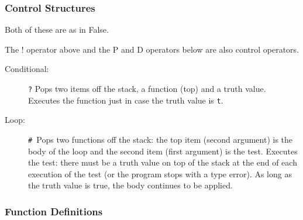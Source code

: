 \documentclass[12pt]{article}
\begin{document}
\subsubsection{Control Structures}

Both of these are as in False.

The ! operator above and the P and D operators below are also
control operators.
\begin{description}
\item[Conditional:]  {\tt ?} Pops two items off the stack, a function (top) and
a truth value.  Executes the function just in case the truth value is {\tt t}.

\item[Loop:]{\tt \# }Pops two functions off the stack:  the top item (second argument)
is the body of the loop and the second item (first argument) is the
test.  Executes the test: there must be a truth value on top of the
stack at the end of each execution of the test (or the program stops
with a type error).  As long as the truth value is true, the body
continues to be applied.

\end{description}

\subsubsection{Function Definitions}
\end{document}
